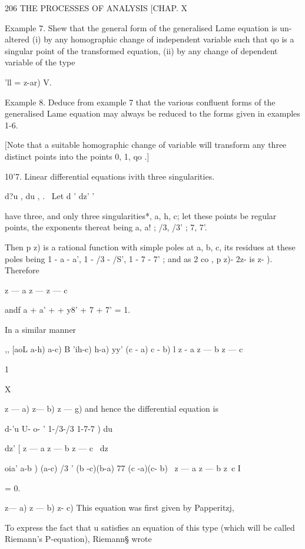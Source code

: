 206 THE PROCESSES OF ANALYSIS [CHAP. X 

Example 7. Shew that the general form of the generalised Lame equation is un- 
altered (i) by any homographic change of independent variable such that qo is a singular 
point of the transformed equation, (ii) by any change of dependent variable of the type 

'll =  z-ar)  V. 

Example 8. Deduce from example 7 that the various confluent forms of the 
generalised Lame equation may always be reduced to the forms given in examples 1-6. 

[Note that a suitable homographic change of variable will transform any three distinct 
points into the points 0, 1, qo .] 

10'7. Linear differential equations ivith three singularities. 

d?u ,  du , . \  
Let d '   dz'   '  

have three, and only three singularities*, a, h, c; let these points be regular 
points, the exponents thereat being a, a! ; /3, /3' ; 7, 7'. 

Then p  z) is a rational function with simple poles at a, b, c, its residues at 
these poles being 1 - a - a', 1 - /3 - /S', 1 - 7 - 7' ; and as 2   co , p z)- 2z-  
is  z- ). Therefore 

  z — a z — z — c 

andf a + a' +   + y8' + 7 + 7' = 1. 

In a similar manner 

,, [aoL  a-h) a-c) B 'ih-c) h-a) yy' (c - a)  c - b) 
   l  z - a z — b z — c 

1 

X 



 z — a) z— b)  z — g) 
and hence the differential equation is 

d-'u U- o- ' 1-/3-/3  1-7-7 ) du 



dz' [ z — a z — b z — c \ dz 

  oia' a-b ) (a-c) /3 ' (b -c)(b-a) 77 (c -a)(c- b) \ 
z — a z — b z~c I 



= 0. 



 z— a) z — b) z- c) 
This equation was first given by Papperitzj, 

To express the fact that u satisfies an equation of this type (which will be 
called Riemann's P-equation), Riemann§ wrote 

